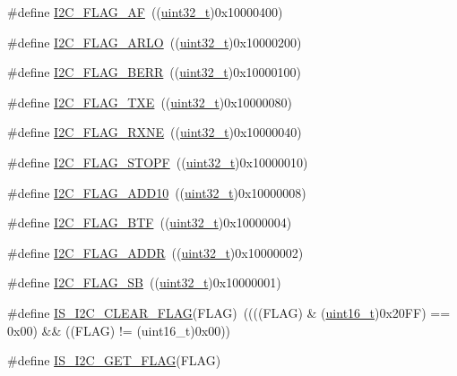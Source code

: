 \begin{DoxyCompactItemize}
\item 
\#define \hyperlink{group___i2_c__flags__definition_ga2f89dbba9b964e6ade1480705e7a97d4}{I2\+C\+\_\+\+F\+L\+A\+G\+\_\+\+AF}~((\hyperlink{_p_e___types_8h_a33594304e786b158f3fb30289278f5af}{uint32\+\_\+t})0x10000400)
\item 
\#define \hyperlink{group___i2_c__flags__definition_gae1e67936f4780e42b8bbe04ac9c20a7b}{I2\+C\+\_\+\+F\+L\+A\+G\+\_\+\+A\+R\+LO}~((\hyperlink{_p_e___types_8h_a33594304e786b158f3fb30289278f5af}{uint32\+\_\+t})0x10000200)
\item 
\#define \hyperlink{group___i2_c__flags__definition_ga0454176b6ddd5c402abc3ef5953a21ad}{I2\+C\+\_\+\+F\+L\+A\+G\+\_\+\+B\+E\+RR}~((\hyperlink{_p_e___types_8h_a33594304e786b158f3fb30289278f5af}{uint32\+\_\+t})0x10000100)
\item 
\#define \hyperlink{group___i2_c__flags__definition_gaeda14a3e9d02ff20a0d001bba9328f3d}{I2\+C\+\_\+\+F\+L\+A\+G\+\_\+\+T\+XE}~((\hyperlink{_p_e___types_8h_a33594304e786b158f3fb30289278f5af}{uint32\+\_\+t})0x10000080)
\item 
\#define \hyperlink{group___i2_c__flags__definition_gad53c5b70a186f699f187c7a641ab0dac}{I2\+C\+\_\+\+F\+L\+A\+G\+\_\+\+R\+X\+NE}~((\hyperlink{_p_e___types_8h_a33594304e786b158f3fb30289278f5af}{uint32\+\_\+t})0x10000040)
\item 
\#define \hyperlink{group___i2_c__flags__definition_gacc7d993963e199a6ddba391dab8da896}{I2\+C\+\_\+\+F\+L\+A\+G\+\_\+\+S\+T\+O\+PF}~((\hyperlink{_p_e___types_8h_a33594304e786b158f3fb30289278f5af}{uint32\+\_\+t})0x10000010)
\item 
\#define \hyperlink{group___i2_c__flags__definition_ga316c78cbf34b74da96d69f702a0d1444}{I2\+C\+\_\+\+F\+L\+A\+G\+\_\+\+A\+D\+D10}~((\hyperlink{_p_e___types_8h_a33594304e786b158f3fb30289278f5af}{uint32\+\_\+t})0x10000008)
\item 
\#define \hyperlink{group___i2_c__flags__definition_ga4dc3d44342007a5cd21c3baa0d938606}{I2\+C\+\_\+\+F\+L\+A\+G\+\_\+\+B\+TF}~((\hyperlink{_p_e___types_8h_a33594304e786b158f3fb30289278f5af}{uint32\+\_\+t})0x10000004)
\item 
\#define \hyperlink{group___i2_c__flags__definition_ga5472d1196e934e0cc471aba8f66af416}{I2\+C\+\_\+\+F\+L\+A\+G\+\_\+\+A\+D\+DR}~((\hyperlink{_p_e___types_8h_a33594304e786b158f3fb30289278f5af}{uint32\+\_\+t})0x10000002)
\item 
\#define \hyperlink{group___i2_c__flags__definition_gae009ab84be03fcc438625b1c39376ad4}{I2\+C\+\_\+\+F\+L\+A\+G\+\_\+\+SB}~((\hyperlink{_p_e___types_8h_a33594304e786b158f3fb30289278f5af}{uint32\+\_\+t})0x10000001)
\item 
\#define \hyperlink{group___i2_c__flags__definition_ga66c8180841350c47627c323acfe42ee9}{I\+S\+\_\+\+I2\+C\+\_\+\+C\+L\+E\+A\+R\+\_\+\+F\+L\+AG}(F\+L\+AG)~((((F\+L\+AG) \& (\hyperlink{_p_e___types_8h_a1f1825b69244eb3ad2c7165ddc99c956}{uint16\+\_\+t})0x20\+F\+F) == 0x00) \&\& ((\+F\+L\+A\+G) != (uint16\+\_\+t)0x00))
\item 
\#define \hyperlink{group___i2_c__flags__definition_ga1a2c2a7c50cd8e33e532918106b4f6ce}{I\+S\+\_\+\+I2\+C\+\_\+\+G\+E\+T\+\_\+\+F\+L\+AG}(F\+L\+AG)
\end{DoxyCompactItemize}


